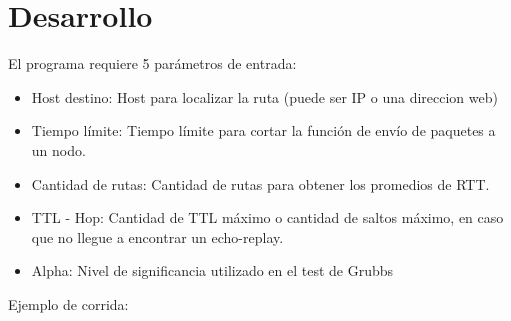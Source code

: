 \section{Desarrollo}


El programa requiere 5 parámetros de entrada:

\begin{itemize}

\item  Host destino: Host para localizar la ruta (puede ser IP o una direccion web)

\item Tiempo límite: Tiempo límite para cortar la función de envío de paquetes a un nodo.

\item Cantidad de rutas: Cantidad de rutas para obtener los promedios de RTT.

\item TTL - Hop: Cantidad de TTL máximo o cantidad de saltos m\'aximo, en caso que no llegue a encontrar un echo-replay.

\item Alpha:  Nivel de significancia utilizado en el test de Grubbs

\end{itemize}

Ejemplo de corrida:
\\
\\

